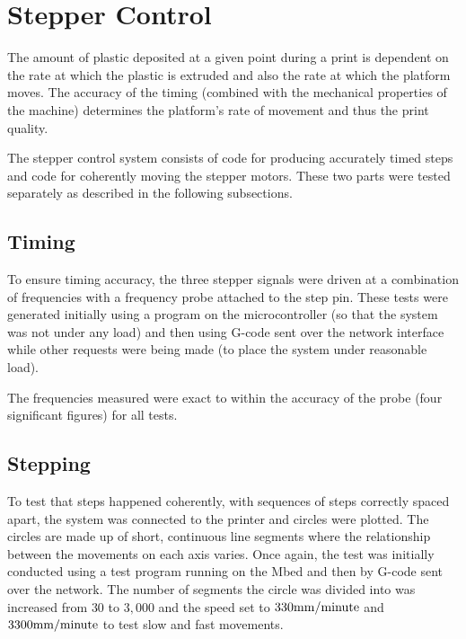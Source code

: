 	\section{Stepper Control}
		
		The amount of plastic deposited at a given point during a print is dependent
		on the rate at which the plastic is extruded and also the rate at which the
		platform moves. The accuracy of the timing (combined with the mechanical
		properties of the machine) determines the platform's rate of movement and
		thus the print quality.
		
		The stepper control system consists of code for producing accurately timed
		steps and code for coherently moving the stepper motors. These two parts
		were tested separately as described in the following subsections.
		
		\subsection{Timing}
			
			To ensure timing accuracy, the three stepper signals were driven at a
			combination of frequencies with a frequency probe attached to the step
			pin. These tests were generated initially using a program on the
			microcontroller (so that the system was not under any load) and then using
			G-code sent over the network interface while other requests were being
			made (to place the system under reasonable load).
			
			The frequencies measured were exact to within the accuracy of the probe
			(four significant figures) for all tests.
			
		
		\subsection{Stepping}
			
			To test that steps happened coherently, with sequences of steps correctly
			spaced apart, the system was connected to the printer and circles were
			plotted. The circles are made up of short, continuous line segments where
			the relationship between the movements on each axis varies. Once again,
			the test was initially conducted using a test program running on the Mbed
			and then by G-code sent over the network. The number of segments the
			circle was divided into was increased from $30$ to $3,000$ and the speed
			set to $330\textrm{mm}/\textrm{minute}$ and $3300\textrm{mm}/\textrm{minute}$ to test slow and fast
			movements.
			
